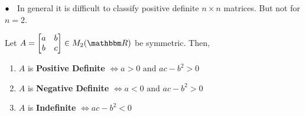 \documentclass[../Analysis-3]{subfiles}
\begin{document}
$\bullet \hspace{2mm} $ In general it is difficult to classify positive definite $n \times n$ matrices. But not for $n = 2$.

\begin{Thm}{}{}
    Let $A = \begin{bmatrix}
            a & b \\
            b & c
        \end{bmatrix} \in M_2(\R) $ be symmetric. Then,
    \begin{enumerate}
        \item $A$ is \textbf{Positive Definite} $ \Longleftrightarrow a > 0 \text{ and } ac -b^2 >0 $
        \item $A$ is \textbf{Negative Definite} $ \Longleftrightarrow a < 0 \text{ and } ac -b^2 >0 $
        \item $A$ is \textbf{Indefinite} $ \Longleftrightarrow ac -b^2 <0 $
    \end{enumerate}
\end{Thm}
\end{document}
